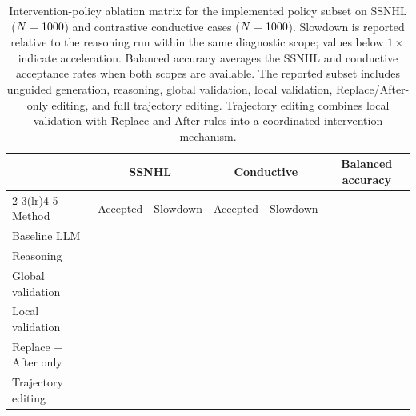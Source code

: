 \documentclass[twocolumn]{article}
\begin{document}
\begin{table}[!htbp]
  \centering
  \small
  \begin{tabular}{lccccc}
    \toprule
    & \multicolumn{2}{c}{SSNHL} & \multicolumn{2}{c}{Conductive} &
    \multirow{2}{*}{Balanced accuracy} \\
    \cmidrule(lr){2-3}\cmidrule(lr){4-5} Method & Accepted & Slowdown & Accepted
    & Slowdown & \\
    \midrule
    Baseline LLM & \SSNHLBaselineAcceptedPct{} & \SSNHLBaselineSlowdownX{} &
    \ConductiveBaselineAcceptedPct{} & \ConductiveBaselineSlowdownX{} &
    \CombinedBaselineBalancedAccuracyPct{} \\
    Reasoning & \SSNHLReasoningAcceptedPct{} & \SSNHLReasoningSlowdownX{} &
    \ConductiveReasoningAcceptedPct{} & \ConductiveReasoningSlowdownX{} &
    \CombinedReasoningBalancedAccuracyPct{} \\
    Global validation & \SSNHLGlobalValidationAcceptedPct{} &
    \SSNHLGlobalValidationSlowdownX{} & \ConductiveGlobalValidationAcceptedPct{}
    & \ConductiveGlobalValidationSlowdownX{} &
    \CombinedGlobalValidationBalancedAccuracyPct{} \\
    Local validation & \SSNHLLocalValidationAcceptedPct{} &
    \SSNHLLocalValidationSlowdownX{} & \ConductiveLocalValidationAcceptedPct{} &
    \ConductiveLocalValidationSlowdownX{} &
    \CombinedLocalValidationBalancedAccuracyPct{} \\
    Replace + After only & \SSNHLReplaceAfterAcceptedPct{} &
    \SSNHLReplaceAfterSlowdownX{} & \ConductiveReplaceAfterAcceptedPct{} &
    \ConductiveReplaceAfterSlowdownX{} &
    \CombinedReplaceAfterBalancedAccuracyPct{} \\
    Trajectory editing & \SSNHLTrajectoryAcceptedPct{} &
    \SSNHLTrajectorySlowdownX{} & \ConductiveTrajectoryAcceptedPct{} &
    \ConductiveTrajectorySlowdownX{} & \CombinedTrajectoryBalancedAccuracyPct{}
    \\
    \bottomrule
  \end{tabular}
\caption{Intervention-policy ablation matrix for the implemented policy subset
  on SSNHL ($N=1000{}$) and contrastive conductive cases
  ($N=1000{}$). Slowdown is reported relative to the reasoning run within
  the same diagnostic scope; values below $1\times$ indicate acceleration.
  Balanced accuracy averages the SSNHL and conductive acceptance rates when both
  scopes are available. The reported subset includes unguided generation,
  reasoning, global validation, local validation, Replace/After-only editing,
  and full trajectory editing. Trajectory editing combines local validation with
  Replace and After rules into a coordinated intervention
  mechanism.}\label{tab:ssnhl-results}
\end{table}
\end{document}
